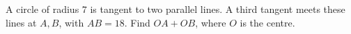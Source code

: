 A circle of radius 7 is tangent to two parallel lines. A third tangent meets these lines at $ A,B $, with $ AB=18 $. Find $ OA+OB $, where $ O $ is the centre.
